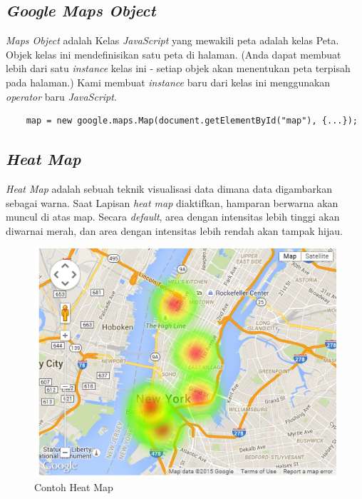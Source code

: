  
 
 \subsection{\textit{Google Maps Object}}
 \textit{Maps Object} adalah Kelas \textit{JavaScript} yang mewakili peta adalah kelas Peta. Objek kelas ini mendefinisikan satu peta di halaman. (Anda dapat membuat lebih dari satu \textit{instance} kelas ini - setiap objek akan menentukan peta terpisah pada halaman.) Kami membuat \textit{instance} baru dari kelas ini menggunakan \textit{operator} baru \textit{JavaScript}.
  \begin{lstlisting}
    map = new google.maps.Map(document.getElementById("map"), {...});
 \end{lstlisting}
 \subsection{\textit{Heat Map}}
 \label{subsec:heat map}
 \textit{Heat Map} adalah sebuah teknik visualisasi data dimana data digambarkan sebagai warna. Saat Lapisan \textit{heat map} diaktifkan, hamparan berwarna akan muncul di atas map. Secara  \textit{default}, area dengan intensitas lebih tinggi akan diwarnai merah, dan area dengan intensitas lebih rendah akan tampak hijau.

 \begin{figure}[H]
    \centering
    \includegraphics[scale=0.5]{Gambar/heat-map-example}
    \caption{Contoh Heat Map }
    \label{fig:my_label}
\end{figure}

